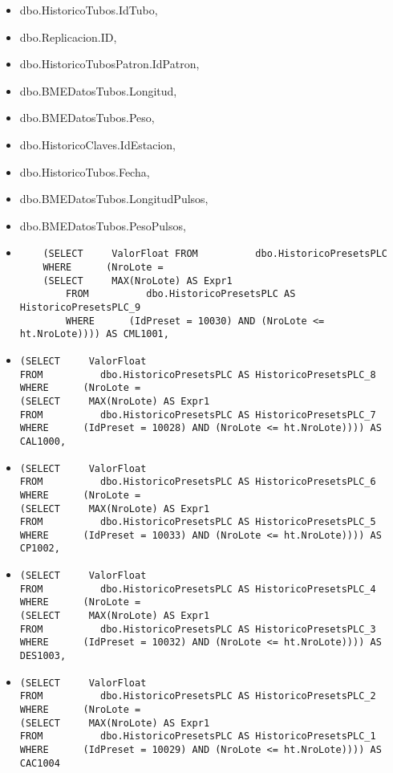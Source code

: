 \documentclass[]{article}
\begin{document}
\begin{itemize}[label=\textcolor{blue}{\textbullet}]
\item dbo.HistoricoTubos.IdTubo, 
\item dbo.Replicacion.ID, 
\item dbo.HistoricoTubosPatron.IdPatron, 
\item dbo.BMEDatosTubos.Longitud, 
\item dbo.BMEDatosTubos.Peso, 
\item dbo.HistoricoClaves.IdEstacion, 
\item dbo.HistoricoTubos.Fecha, 
\item dbo.BMEDatosTubos.LongitudPulsos, 
\item dbo.BMEDatosTubos.PesoPulsos,
\item \begin{verbatim}
	(SELECT     ValorFloat FROM          dbo.HistoricoPresetsPLC
	WHERE      (NroLote =
	(SELECT     MAX(NroLote) AS Expr1
		FROM          dbo.HistoricoPresetsPLC AS HistoricoPresetsPLC_9
		WHERE      (IdPreset = 10030) AND (NroLote <= ht.NroLote)))) AS CML1001,
	\end{verbatim}

\item \begin{verbatim}(SELECT     ValorFloat
FROM          dbo.HistoricoPresetsPLC AS HistoricoPresetsPLC_8
WHERE      (NroLote =
(SELECT     MAX(NroLote) AS Expr1
FROM          dbo.HistoricoPresetsPLC AS HistoricoPresetsPLC_7
WHERE      (IdPreset = 10028) AND (NroLote <= ht.NroLote)))) AS CAL1000,
\end{verbatim}
\item \begin{verbatim}(SELECT     ValorFloat
FROM          dbo.HistoricoPresetsPLC AS HistoricoPresetsPLC_6
WHERE      (NroLote =
(SELECT     MAX(NroLote) AS Expr1
FROM          dbo.HistoricoPresetsPLC AS HistoricoPresetsPLC_5
WHERE      (IdPreset = 10033) AND (NroLote <= ht.NroLote)))) AS CP1002,\end{verbatim}
\item \begin{verbatim}(SELECT     ValorFloat
FROM          dbo.HistoricoPresetsPLC AS HistoricoPresetsPLC_4
WHERE      (NroLote =
(SELECT     MAX(NroLote) AS Expr1
FROM          dbo.HistoricoPresetsPLC AS HistoricoPresetsPLC_3
WHERE      (IdPreset = 10032) AND (NroLote <= ht.NroLote)))) AS DES1003,\end{verbatim}
\item \begin{verbatim}(SELECT     ValorFloat
FROM          dbo.HistoricoPresetsPLC AS HistoricoPresetsPLC_2
WHERE      (NroLote =
(SELECT     MAX(NroLote) AS Expr1
FROM          dbo.HistoricoPresetsPLC AS HistoricoPresetsPLC_1
WHERE      (IdPreset = 10029) AND (NroLote <= ht.NroLote)))) AS CAC1004 \end{verbatim}
\end{itemize}
\end{document}
